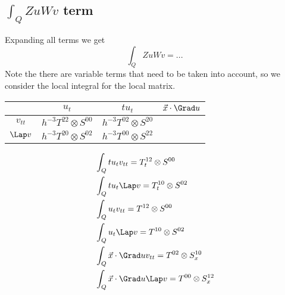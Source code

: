 \documentclass[]{report}
\begin{document}
    \subsection*{$\int_Q {Z}u {W}v$ term}
    Expanding all terms we get
    \begin{equation*}
        \int_Q Zu Wv = ...
    \end{equation*}
    Note the there are variable terms that need to be taken into account, so we consider the local integral for the local matrix.
    \begin{center}
        \begin{tabular}[]{|c||c|c|c|}
            \hline
                        & $u_{t}$ & $t u_t$ & $\vec{x} \cdot \Grad u$ \\
            \hline \hline
            $v_{tt}$    & $h^{-3} T^{22} \otimes S^{00} $ & $h^{-3}  T^{02} \otimes S^{20}$ \\
            \hline
            $\Lap v$    & $h^{-3} T^{20} \otimes S^{02}$ & $h^{-3}  T^{00} \otimes S^{22}$ \\
            \hline
        \end{tabular}
    \end{center}

    \begin{align*}
        &\int_Q t u_t v_{tt} =  T^{12}_t \otimes S^{00} \\
        &\int_Q t u_t \Lap v = T^{10}_t \otimes S^{02}  \\
        &\int_Q u_t v_{tt} = T^{12} \otimes S^{00}  \\
        &\int_Q u_t \Lap v =  T^{10} \otimes S^{02}  \\
        &\int_Q \vec{x} \cdot \Grad u v_{tt} = T^{02} \otimes S^{10}_x \\
        &\int_Q \vec{x} \cdot \Grad u \Lap v = T^{00}  \otimes S^{12}_x 
    \end{align*}
\end{document}
